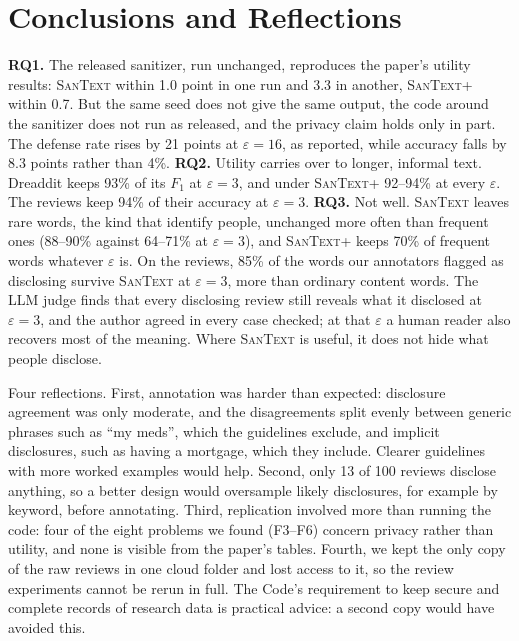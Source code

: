 \documentclass[11pt]{article}
\newcommand{\santext}{\textsc{SanText}}
\newcommand{\santextp}{\textsc{SanText}+}
\begin{document}
\section{Conclusions and Reflections}
\label{sec:conclusion}
\textbf{RQ1.} The released sanitizer, run unchanged, reproduces the paper's utility results: \santext{} within 1.0 point in one run and 3.3 in another, \santextp{} within 0.7. But the same seed does not give the same output, the code around the sanitizer does not run as released, and the privacy claim holds only in part. The defense rate rises by 21 points at $\varepsilon = 16$, as reported, while accuracy falls by 8.3 points rather than 4\%. \textbf{RQ2.} Utility carries over to longer, informal text. Dreaddit keeps 93\% of its $F_1$ at $\varepsilon = 3$, and under \santextp{} 92--94\% at every $\varepsilon$. The reviews keep 94\% of their accuracy at $\varepsilon = 3$. \textbf{RQ3.} Not well. \santext{} leaves rare words, the kind that identify people, unchanged more often than frequent ones (88--90\% against 64--71\% at $\varepsilon = 3$), and \santextp{} keeps 70\% of frequent words whatever $\varepsilon$ is. On the reviews, 85\% of the words our annotators flagged as disclosing survive \santext{} at $\varepsilon = 3$, more than ordinary content words. The LLM judge finds that every disclosing review still reveals what it disclosed at $\varepsilon = 3$, and the author agreed in every case checked; at that $\varepsilon$ a human reader also recovers most of the meaning. Where \santext{} is useful, it does not hide what people disclose.

Four reflections. First, annotation was harder than expected: disclosure agreement was only moderate, and the disagreements split evenly between generic phrases such as ``my meds'', which the guidelines exclude, and implicit disclosures, such as having a mortgage, which they include. Clearer guidelines with more worked examples would help. Second, only 13 of 100 reviews disclose anything, so a better design would oversample likely disclosures, for example by keyword, before annotating. Third, replication involved more than running the code: four of the eight problems we found (F3--F6) concern privacy rather than utility, and none is visible from the paper's tables. Fourth, we kept the only copy of the raw reviews in one cloud folder and lost access to it, so the review experiments cannot be rerun in full. The Code's requirement to keep secure and complete records of research data is practical advice: a second copy would have avoided this.
\end{document}
